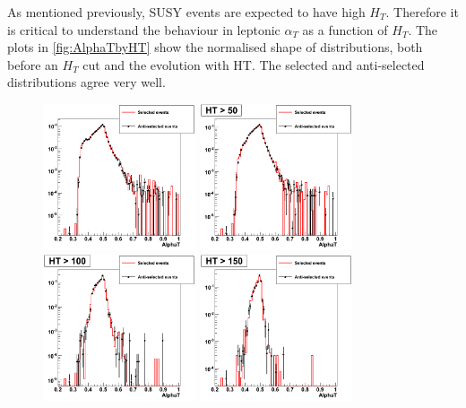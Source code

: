 \documentclass[12pt]{article}
\begin{document}
As mentioned previously, SUSY events are expected to have high $H_{T}$. Therefore it is critical to understand the behaviour in leptonic $\alpha_T$ as a function of $H_{T}$. The plots in \ref{fig:AlphaTbyHT} show the normalised shape of distributions, both before an $H_{T}$ cut and the evolution with HT. The selected and anti-selected distributions agree very well.
\begin{figure}[h!]

\includegraphics[width=45mm]{leptonicalphaT/alphat_1}
\hspace*{-2mm}
\includegraphics[width=45mm]{leptonicalphaT/alphat_2}
\hspace*{-2mm}
\includegraphics[width=45mm]{leptonicalphaT/alphat_3}
\includegraphics[width=45mm]{leptonicalphaT/alphat_4}
\hspace*{6mm}

\end{figure}
\end{document}

